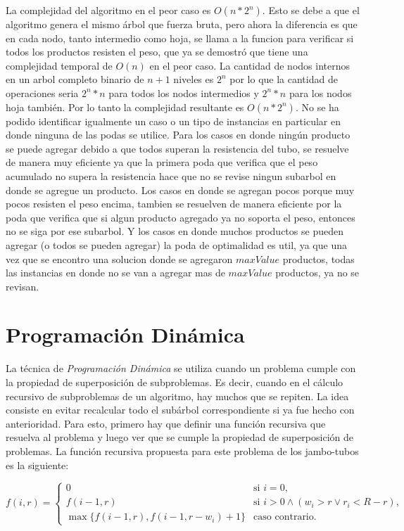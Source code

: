 \documentclass[10pt,a4paper]{article}
\begin{document}
La complejidad del algoritmo en el peor caso es $O(n*2^n)$. Esto se debe a que el algoritmo genera el mismo árbol que fuerza bruta, pero ahora la diferencia es que en cada nodo, tanto intermedio como hoja, se llama a la funcion para verificar si todos los productos resisten el peso, que ya se demostró que tiene una complejidad temporal de $O(n)$ en el peor caso. La cantidad de nodos internos en un arbol completo binario de $n + 1$ niveles es $2^n$ por lo que la cantidad de operaciones seria $2^n*n$ para todos los nodos intermedios y $2^n*n$ para los nodos hoja también. Por lo tanto la complejidad resultante es $O(n*2^n)$. No se ha podido identificar igualmente un caso o un tipo de instancias en particular en donde ninguna de las podas se utilice. Para los casos en donde ningún producto se puede agregar debido a que todos superan la resistencia del tubo, se resuelve de manera muy eficiente ya que la primera poda que verifica que el peso acumulado no supera la resistencia hace que no se revise ningun subarbol en donde se agregue un producto. Los casos en donde se agregan pocos porque muy pocos resisten el peso encima, tambien se resuelven de manera eficiente por la poda que verifica que si algun producto agregado ya no soporta el peso, entonces no se siga por ese subarbol. Y los casos en donde muchos productos se pueden agregar (o todos se pueden agregar) la poda de optimalidad es util, ya que una vez que se encontro una solucion donde se agregaron $maxValue$ productos, todas las instancias en donde no se van a agregar mas de $maxValue$ productos, ya no se revisan.

\section{Programación Dinámica} \label{sec:dp}
La técnica de \emph{Programación Dinámica} se utiliza cuando un problema cumple con la propiedad de superposición de subproblemas. Es decir, cuando en el cálculo recursivo de subproblemas de un algoritmo, hay muchos que se repiten. La idea consiste en evitar recalcular todo el subárbol correspondiente si ya fue hecho con anterioridad. Para esto, primero hay que definir una función recursiva que resuelva al problema y luego ver que se cumple la propiedad de superposición de problemas. La función recursiva propuesta para este problema de los jambo-tubos es la siguiente: 

\begin{equation} \label{eq:dp}
    f(i, r) = \begin{cases}
        0 & \text{si } i = 0,\\
        f(i -1, r) & \text{si } i > 0 \land (w_i > r \lor r_i < R - r),\\
        \max \{ f(i-1, r), f(i-1, r - w_i) + 1 \} & \text{caso contrario. }
    \end{cases}
\end{equation}
\end{document}
